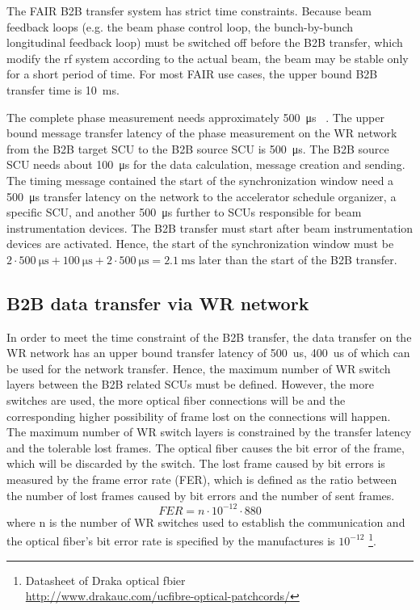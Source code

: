The FAIR B2B transfer system has strict time constraints. Because beam feedback loops (e.g. the beam phase control
loop, the bunch-by-bunch longitudinal feedback loop) must be switched off before the B2B transfer, which modify the rf system according to the actual beam, the beam may be stable only for a short period of time. For most FAIR use cases, the upper bound B2B transfer time is \SI{10}{\ms}. 

The complete phase measurement needs approximately \SI{500}{\us} ~\cite{ferrand_development_nodata}. The upper bound message transfer latency of the phase measurement on the WR network from the B2B target SCU to the B2B source SCU is \SI{500}{\us}. The B2B source SCU needs about \SI{100}{\us} for the data calculation, message creation and sending. The timing message contained the start of the synchronization window need a \SI{500}{\us} transfer latency on the network to the accelerator schedule organizer, a specific SCU, and another \SI{500}{\us} further to SCUs responsible for beam instrumentation devices. The B2B transfer must start after beam instrumentation devices are activated. Hence, the start of the synchronization window must be $2 \cdot \SI{500}{\us} + \SI{100}{\us} + 2\cdot\SI{500}{\us} = \SI{2.1}{\ms}$ later than the start of the B2B transfer. 

\subsection{B2B data transfer via WR network}
In order to meet the time constraint of the B2B transfer, the data transfer on the WR network has an upper bound transfer latency of \SI{500}{us}, \SI{400}{us} of which can be used for the network transfer. Hence, the maximum number of WR switch layers between the B2B related SCUs must be defined. However, the more switches are used, the more optical fiber connections will be and the corresponding higher possibility of frame lost on the connections will happen. The maximum number of WR switch layers is constrained by the transfer latency and the tolerable lost frames. The optical fiber causes the bit error of the frame, which will be discarded by the switch. The lost frame caused by bit errors is measured by the frame error rate (FER), which is defined as the ratio between the number of lost frames caused by bit errors and the number of sent frames. 
\begin{equation}
\label{FER}
	FER=n\cdot10^{-12}\cdot880
\end{equation}
where n is the number of WR switches used to establish the communication and the optical fiber's bit error rate is specified by the manufactures is $10^{-12}$ \footnote{Datasheet of Draka optical fbier \\ \url{http://www.drakauc.com/ucfibre-optical-patchcords/}}.  

